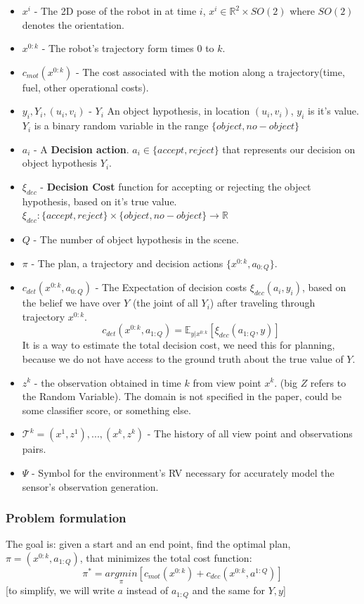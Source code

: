 \documentclass{article}
\begin{document}
	\begin{itemize}
		\item $x^i$ - The 2D pose of the robot in at time $i$,
		$x^i \in \mathbb{R}^2 \times SO(2)$ where $SO(2)$ denotes the orientation.
		\item $x^{0:k}$ - The robot's trajectory form times $0$ to $k$.
		\item $c_{mot}(x^{0:k})$ - The cost associated with the motion along a trajectory(time, fuel, other operational costs).
		\item $y_i, Y_i, (u_i, v_i)$ - $Y_i$ An object hypothesis, in location $(u_i, v_i)$,
		$y_i$ is it's value. $Y_i$ is a binary random variable in the range $\{object,no-object\}$
		\item $a_i$ - A \textbf{Decision action}. $a_i\in\{accept,reject\}$ that represents our decision on object hypothesis $Y_i$. 
		\item $\xi_{dec}$ - \textbf{Decision Cost} function for accepting or rejecting the object hypothesis, based on it's true value.
		$\xi_{dec} : \{accept,reject\}\times\{object,no-object\}\rightarrow\mathbb{R}$ 
		\item $Q$ - The number of object hypothesis in the scene.
		\item $\pi$ - The plan, a trajectory and decision actions $\{x^{0:k},a_{0:Q}\}$.
		\item $c_{det}(x^{0:k},a_{0:Q})$ - The Expectation of decision costs $\xi_{dec}(a_i,y_i)$, based on the belief we have over $Y$ (the joint of all $Y_i$) after traveling through trajectory $x^{0:k}$.
		\begin{equation}
		c_{det}(x^{0:k},a_{1:Q})=\mathbb{E}_{y|x^{0:k}}[\xi_{dec}(a_{1:Q},y)]
		\end{equation}  
		It is a way to estimate the total decision cost, we need this for planning, because we do not have access to the ground truth about the true value of $Y$.
		\item $z^k$ - the observation obtained in time $k$ from view point $x^k$. (big $Z$ refers to the Random Variable). The domain is not specified in the paper, could be some classifier score, or something else.
		\item $\mathcal{T}^k = {(x^1,z^1),...,(x^k,z^k)}$ - The history of all view point and observations pairs.
		\item $\Psi$ - Symbol for the environment's RV necessary for accurately model the sensor's observation generation.
	\end{itemize}
	\subsubsection{Problem formulation}
	The goal is:
	given a start and an end point,
	find the optimal plan, $\pi=(x^{0:k},a_{1:Q})$, that minimizes the total cost function:
	\begin{equation}
	\pi^* = \underset{\pi}{argmin}[c_{mot}(x^{0:k}) + c_{dec}(x^{0:k},a^{1:Q})]
	\end{equation}
	[to simplify, we will write $a$ instead of $a_{1:Q}$ and the same for $Y,y$]
	
\end{document}
